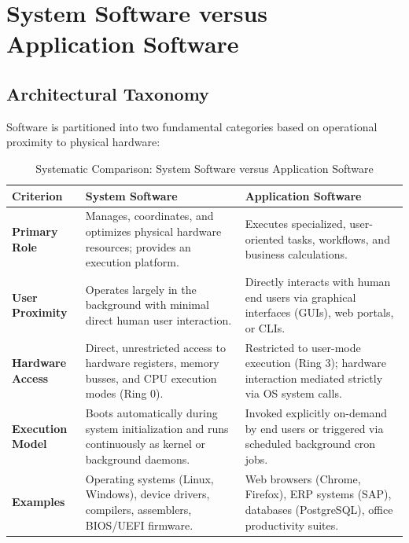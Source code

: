 \section{System Software versus Application Software}
\label{sec:system_vs_application_software}

\subsection{Architectural Taxonomy}
Software is partitioned into two fundamental categories based on operational proximity to physical hardware:
\begin{table}[htbp]
\centering
\small
\caption{Systematic Comparison: System Software versus Application Software}
\label{tab:system_vs_app_software}
\begin{tabularx}{\textwidth}{l p{5cm} X}
\toprule
\textbf{Criterion} & \textbf{System Software} & \textbf{Application Software} \\
\midrule
\textbf{Primary Role} & Manages, coordinates, and optimizes physical hardware resources; provides an execution platform. & Executes specialized, user-oriented tasks, workflows, and business calculations. \\
\textbf{User Proximity} & Operates largely in the background with minimal direct human user interaction. & Directly interacts with human end users via graphical interfaces (GUIs), web portals, or CLIs. \\
\textbf{Hardware Access} & Direct, unrestricted access to hardware registers, memory busses, and CPU execution modes (Ring 0). & Restricted to user-mode execution (Ring 3); hardware interaction mediated strictly via OS system calls. \\
\textbf{Execution Model} & Boots automatically during system initialization and runs continuously as kernel or background daemons. & Invoked explicitly on-demand by end users or triggered via scheduled background cron jobs. \\
\textbf{Examples} & Operating systems (Linux, Windows), device drivers, compilers, assemblers, BIOS/UEFI firmware. & Web browsers (Chrome, Firefox), ERP systems (SAP), databases (PostgreSQL), office productivity suites. \\
\bottomrule
\end{tabularx}
\end{table}

